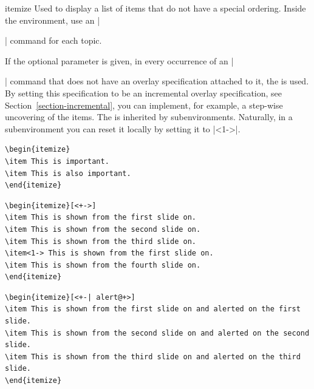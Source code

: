 \begin{environment}{{itemize}}
  Used to display a list of items that do not have a special ordering. Inside the environment, use an |\item| command for each topic.

  If the optional parameter  is given, in every occurrence of an |\item| command that does not have an overlay specification attached to it, the  is used. By setting this specification to be an incremental overlay specification, see Section~\ref{section-incremental}, you can implement, for example, a step-wise uncovering of the items. The  is inherited by subenvironments. Naturally, in a subenvironment you can reset it locally by setting it to |<1->|.
  \example
\begin{verbatim}
\begin{itemize}
\item This is important.
\item This is also important.
\end{itemize}
\end{verbatim}

  \example
\begin{verbatim}
\begin{itemize}[<+->]
\item This is shown from the first slide on.
\item This is shown from the second slide on.
\item This is shown from the third slide on.
\item<1-> This is shown from the first slide on.
\item This is shown from the fourth slide on.
\end{itemize}
\end{verbatim}

  \example
\begin{verbatim}
\begin{itemize}[<+-| alert@+>]
\item This is shown from the first slide on and alerted on the first slide.
\item This is shown from the second slide on and alerted on the second slide.
\item This is shown from the third slide on and alerted on the third slide.
\end{itemize}
\end{verbatim}


\end{environment}
